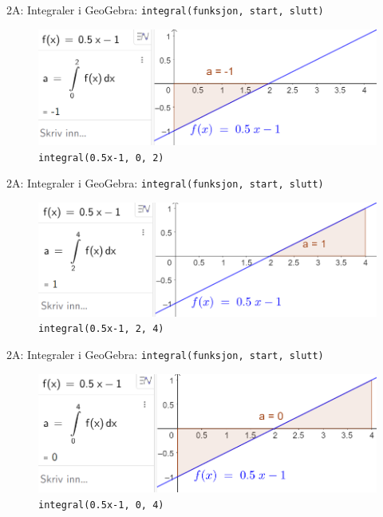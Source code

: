 \blueheader
\begin{frame}[fragile]{2A: Integraler i GeoGebra: \texttt{integral(funksjon, start, slutt)}}
\begin{figure}
    \centering
    \includegraphics[width=\linewidth]{R2-K2A-9.png}
    \caption{\texttt{integral(0.5x-1, 0, 2)}}
\end{figure}
\end{frame}

\blueheader
\begin{frame}[fragile]{2A: Integraler i GeoGebra: \texttt{integral(funksjon, start, slutt)}}
\begin{figure}
    \centering
    \includegraphics[width=\linewidth]{R2-K2A-10.png}
    \caption{\texttt{integral(0.5x-1, 2, 4)}}
\end{figure}
\end{frame}

\blueheader
\begin{frame}[fragile]{2A: Integraler i GeoGebra: \texttt{integral(funksjon, start, slutt)}}
\begin{figure}
    \centering
    \includegraphics[width=\linewidth]{R2-K2A-11.png}
    \caption{\texttt{integral(0.5x-1, 0, 4)}}
\end{figure}
\end{frame}

